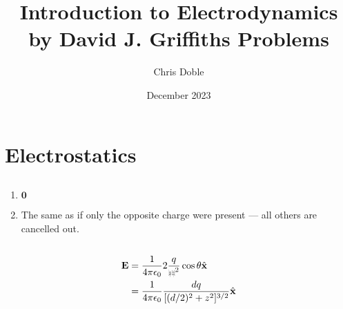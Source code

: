 \documentclass{article}
\title{Introduction to Electrodynamics by David J. Griffiths Problems}
\author{Chris Doble}
\date{December 2023}
\renewcommand{\vec}[1]{\boldsymbol{\mathbf{#1}}}
\newcommand{\uvec}[1]{\hat{\vec{#1}}}
\newcommand{\ke}{\frac{1}{4 \pi \epsilon_0}}
\def\rcurs{{\mbox{$\resizebox{.09in}{.08in}{\texttt{[image: ScriptR]}}$}}}
\begin{document}
\maketitle

\tableofcontents

\setcounter{section}{1}
\section{Electrostatics}

\subsection{}

\begin{enumerate}
  \item $\vec{0}$

  \item The same as if only the opposite charge were present — all others are cancelled out.
\end{enumerate}

\subsection{}

\begin{align*}
  \vec{E} & = \ke 2 \frac{q}{\rcurs^2} \cos \theta \uvec{x}      \\
          & = \ke \frac{d q}{[(d / 2)^2 + z^2]^{3 / 2}} \uvec{x}
\end{align*}

\subsection{}
\end{document}

